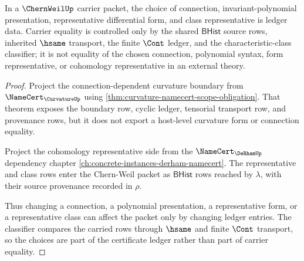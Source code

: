 \begin{theorem}
\label{thm:chernweil-characteristic-class-ledger-obligation}
In a $\ChernWeilUp$ carrier packet, the choice of connection, invariant-polynomial presentation, representative differential form, and class representative is ledger data. Carrier equality is controlled only by the shared $\mathsf{BHist}$ source rows, inherited $\hsame$ transport, the finite $\Cont$ ledger, and the characteristic-class classifier; it is not equality of the chosen connection, polynomial syntax, form representative, or cohomology representative in an external theory.
\end{theorem}
\begin{proof}
Project the connection-dependent curvature boundary from $\NameCert_{\CurvatureUp}$ using \autoref{thm:curvature-namecert-scope-obligation}. That theorem exposes the boundary row, cyclic ledger, tensorial transport row, and provenance rows, but it does not export a host-level curvature form or connection equality.

Project the cohomology representative side from the $\NameCert_{\DeRhamUp}$ dependency chapter \autoref{ch:concrete-instances-derham-namecert}. The representative and class rows enter the Chern-Weil packet as $\mathsf{BHist}$ rows reached by $\lambda$, with their source provenance recorded in $\rho$.

Thus changing a connection, a polynomial presentation, a representative form, or a representative class can affect the packet only by changing ledger entries. The classifier compares the carried rows through $\hsame$ and finite $\Cont$ transport, so the choices are part of the certificate ledger rather than part of carrier equality.
\end{proof}

